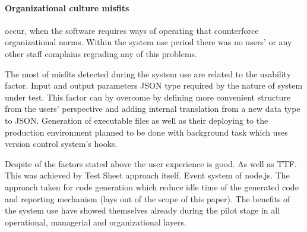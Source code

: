 \paragraph{Organizational culture misfits}  occur, when the software requires ways of operating that counterforce organizational norms. Within the system use period there was no users' or any other staff complains regrading any of this problems.


The most of misfits detected during the system use are related to the usability factor.
Input and output parameters JSON type required by the nature of system under test. This factor can by overcome by defining more convenient structure from the users' perspective and  adding internal translation from a new data type to JSON.
Generation of executable files as well as their deploying to the production environment planned to be done with background task which uses version control system's hooks.


Despite of the factors stated above the user experience is good. As well as TTF. This was achieved by Test Sheet approach itself. Event system of node.js. The approach taken for code generation which reduce idle time of the generated code and reporting mechanism (lays out of the scope of this paper). 
The benefits of the system use have showed themselves already during the pilot stage in all operational, managerial and organizational layers.
